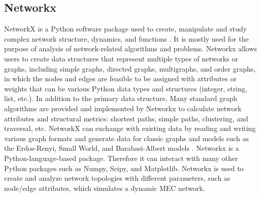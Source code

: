 \subsection{Networkx}
NetworkX is a Python software package used to create, manipulate and study complex network structure, dynamics, and functions \cite{networkx}. It is mostly used for the purpose of analysis of network-related algorithms and problems. Networkx allows users to create data structures that represent multiple types of networks or graphs, including simple graphs, directed graphs, multigraphs, and order graphs, in which the nodes and edges are feasible to be assigned with attributes or weights that can be various Python data types and structures (integer, string, list, etc.). In addition to the primary data structure, Many standard graph algorithms are provided and implemented by Networkx to calculate network attributes and structural metrics: shortest paths, simple paths, clustering, and traversal, etc. NetworkX can exchange with existing data by reading and writing various graph formats and generate data for classic graphs and models such as the Erdos-Renyi, Small World, and Barabasi-Albert models \cite{networkxpaper}. Networkx is a Python-language-based package. Therefore it can interact with many other Python packages such as Numpy, Scipy, and Matplotlib. Networkx is used to create and analyze network topologies with different parameters, such as node/edge attributes, which simulates a dynamic MEC network.


